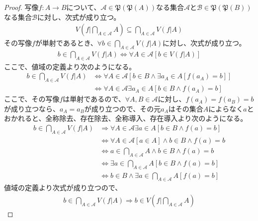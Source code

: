 \documentclass[dvipdfmx]{jsarticle}
\begin{document}
\begin{proof}
写像$f:A \rightarrow B$について、$\mathcal{A \in}\mathfrak{P}\left( \mathfrak{P}(A) \right)$なる集合$\mathcal{A}$と$\mathcal{B \in}\mathfrak{P}\left( \mathfrak{P}(B) \right)$なる集合$\mathcal{B}$に対し、次式が成り立つ。
\begin{align*}
V\left( f|\bigcap_{A \in \mathcal{A}} A \right) \subseteq \bigcap_{A \in \mathcal{A}} {V\left( f|A \right)}
\end{align*}
その写像$f$が単射であるとき、$\forall b \in \bigcap_{A \in \mathcal{A}} {V\left( f|A \right)}$に対し、次式が成り立つ。
\begin{align*}
b \in \bigcap_{A \in \mathcal{A}} {V\left( f|A \right)} \Leftrightarrow \forall A \in \mathcal{A}\left[ b \in V\left( f|A \right) \right]
\end{align*}
ここで、値域の定義より次のようになる。
\begin{align*}
b \in \bigcap_{A \in \mathcal{A}} {V\left( f|A \right)} &\Leftrightarrow \forall A \in \mathcal{A}\left[ b \in B \land \exists a_{A} \in A\left[ f\left( a_{A} \right) = b \right] \right]\\
&\Leftrightarrow \forall A \in \mathcal{A\exists}a_{A} \in A\left[ b \in B \land f\left( a_{A} \right) = b \right]
\end{align*}
ここで、その写像$f$は単射であるので、$\forall A,B \in \mathcal{A}$に対し、$f\left( a_{A} \right) = f\left( a_{B} \right) = b$が成り立つなら、$a_{A} = a_{B}$が成り立つので、その元$a_{A}$はその集合$A$によらなく$a$とおかれると、全称除去、存在除去、全称導入、存在導入より次のようになる。
\begin{align*}
b \in \bigcap_{A \in \mathcal{A}} {V\left( f|A \right)} &\Rightarrow \forall A \in \mathcal{A\exists}a \in A\left[ b \in B \land f(a) = b \right]\\
&\Leftrightarrow \forall A \in \mathcal{A}[ a \in A] \land b \in B \land f(a) = b\\
&\Leftrightarrow a \in \bigcap_{A \in \mathcal{A}} A \land b \in B \land f(a) = b\\
&\Leftrightarrow \exists a \in \bigcap_{A \in \mathcal{A}} A\left[ b \in B \land f(a) = b \right]\\
&\Leftrightarrow b \in B \land \exists a \in \bigcap_{A \in \mathcal{A}} A\left[ f(a) = b \right]
\end{align*}
値域の定義より次式が成り立つので、
\begin{align*}
b \in \bigcap_{A \in \mathcal{A}} {V\left( f|A \right)} \Rightarrow b \in V\left( f|\bigcap_{A \in \mathcal{A}} A \right)

\end{align*}
\end{proof}
\end{document}

